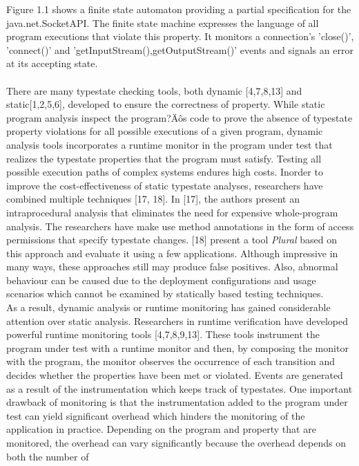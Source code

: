 {Figure 1.1  shows  a  finite state automaton providing a partial specification 
for the   java.net.SocketAPI. The finite state machine expresses the language of 
all program executions that violate this property. It monitors a connection's 
'close()', 'connect()' and 'getInputStream(),getOutputStream()' events and 
signals an error at its accepting state.\\\\
There are many typestate checking tools, both dynamic [4,7,8,13] and 
static[1,2,5,6], developed to ensure the correctness of property. While static 
program analysis inspect the program?Äôs code to prove the absence of typestate 
property violations for all possible executions of a given program, dynamic 
analysis tools incorporates a runtime monitor in the program under test that 
realizes the typestate properties that the program must satisfy. Testing all 
possible execution paths of complex systems endures high costs. Inorder to 
improve the
cost-effectiveness of static typestate analyses, researchers have combined 
multiple techniques [17, 18]. In [17], the authors present an intraprocedural 
analysis that eliminates the need for expensive whole-program analysis. The 
researchers have make use method annotations in the form of access permissions 
that specify typestate changes. [18] present a tool \textit{Plural} based on 
this approach and evaluate it using a few applications. Although impressive in 
many ways, these approaches still may produce false positives. Also, abnormal 
behaviour can be caused due to the deployment configurations and usage scenarios 
which cannot be examined by statically based testing techniques. \\As a result, 
dynamic analysis or runtime monitoring has gained considerable attention over 
static analysis. Researchers in runtime verification have developed powerful 
runtime monitoring tools [4,7,8,9,13]. These tools instrument the program under 
test with a runtime monitor and then, by composing the monitor with the program, 
the 
monitor observes the occurrence of each transition and decides whether the 
properties have been met or violated. Events are generated as a result of the 
instrumentation which keeps track of typestates. One important drawback of 
monitoring is that the instrumentation added to the program under test can yield 
significant overhead which hinders the monitoring of the application in 
practice. Depending on the program and property that are monitored, the overhead 
can vary significantly because the overhead depends on both the number of 
}
